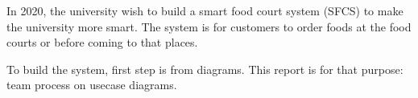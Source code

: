 In 2020, the university wish to build a smart food court system (SFCS) to make the university more smart. The system is for customers to order foods at the food courts or before coming to that places.

To build the system, first step is from diagrams. This report is for that purpose: team process on usecase diagrams.